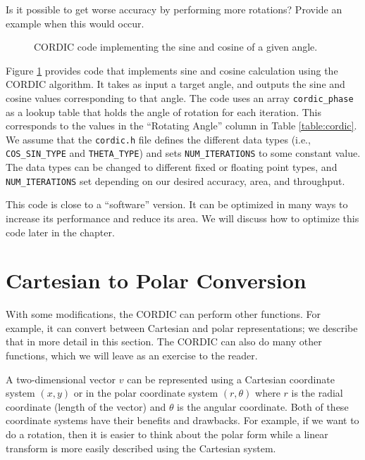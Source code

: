 \begin{exercise}
Is it possible to get worse accuracy by performing more rotations? Provide an example when this would occur.
\end{exercise}

\begin{figure}

\caption{CORDIC code implementing the sine and cosine of a given angle.}
\label{fig:cordic_code}
\end{figure}

Figure \ref{fig:cordic_code} provides code that implements sine and cosine calculation using the CORDIC algorithm. It takes as input a target angle, and outputs the sine and cosine values corresponding to that angle. The code uses an array \lstinline{cordic_phase} as a lookup table that holds the angle of rotation for each iteration. This corresponds to the values in the ``Rotating Angle'' column in Table \ref{table:cordic}. We assume that the \lstinline{cordic.h} file defines the different data types (i.e., \lstinline{COS_SIN_TYPE} and \lstinline{THETA_TYPE}) and sets \lstinline{NUM_ITERATIONS} to some constant value. The data types can be changed to different fixed or floating point types, and \lstinline{NUM_ITERATIONS} set depending on our desired accuracy, area, and throughput. 

This code is close to a ``software'' version. It can be optimized in many ways to increase its performance and reduce its area. We will discuss how to optimize this code later in the chapter.

\section{Cartesian to Polar Conversion}

With some modifications, the CORDIC can perform other functions. For example, it can convert between Cartesian and polar representations; we describe that in more detail in this section. The CORDIC can also do many other functions, which we will leave as an exercise to the reader. 

A two-dimensional vector $v$ can be represented using a Cartesian coordinate system $(x, y)$ or in the polar coordinate system $(r, \theta)$ where  $r$ is the radial coordinate (length of the vector) and $\theta$ is the angular coordinate. Both of these coordinate systems have their benefits and drawbacks. For example, if we want to do a rotation, then it is easier to think about the polar form while a linear transform is more easily described using the Cartesian system. 

